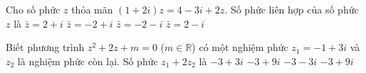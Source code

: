 \begin{ex}%
Cho số phức $z$ thỏa mãn $(1+2i)z=4-3i+2z$. Số phức liên hợp của số phức $z$ là
\choice 
{$\bar{z}=2+i$}
{\True $\bar{z}=-2+i$}
{$\bar{z}=-2-i$}
{$\bar{z}=2-i$}
\end{ex}
\begin{ex}%
Biết phương trình $z^2+2z+m=0$ ($m\in \mathbb{R}$) có một nghiệm phức $z_1=-1+3i$ và $z_2$ là nghiệm phức còn lại. Số phức $z_1+2z_2$ là
\choice 
{$-3+3i$}
{$-3+9i$}
{\True $-3-3i$}
{$-3+9i$}
\end{ex}

